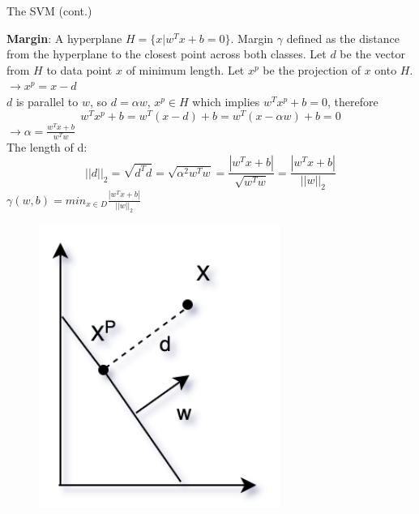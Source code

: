 \documentclass[aspectratio=1610]{beamer}
\begin{document}
\begin{frame}{The SVM (cont.)}
\begin{minipage}{0.65\textwidth}
\textbf{Margin}: A hyperplane $H = \{x|w^Tx+b = 0\}$. Margin $\gamma$ defined as the distance from the hyperplane to the closest point across both classes. Let $d$ be the vector from $H$ to data point $x$ of minimum length. Let $x^p$ be the projection of $x$ onto $H$.
$\to x^p = x - d$\\
$d$ is parallel to $w$, so $d = \alpha w$, $x^p \in H$ which implies $w^Tx^p + b = 0$, therefore
$$w^Tx^p + b = w^T(x-d) + b = w^T(x-\alpha w) + b = 0$$
$\to \alpha = \frac{w^Tx+b}{w^Tw}$\\[0.1cm]
The length of d:\\
$$||d||_2 = \sqrt{d^Td} = \sqrt{\alpha^2w^Tw} = \frac{|w^Tx+b|}{\sqrt{w^Tw}} = \frac{|w^Tx+b|}{||w||_2}$$
$\gamma(w,b) = min_{x\in D}\frac{|w^Tx+b|}{||w||_2}$
\end{minipage}
\begin{minipage}{0.3\textwidth}

    \begin{figure}[h!]
  \includegraphics[width=0.7\textwidth]{Screen Shot 2022-06-02 at 21.33.43.png}
\end{figure}
\end{minipage}
    
\end{frame}
\end{document}
